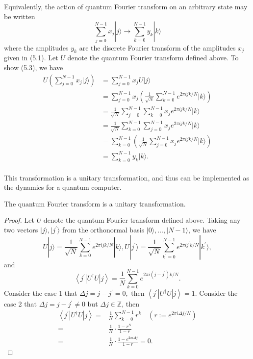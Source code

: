 Equivalently, the action of quantum Fourier transform on an arbitrary state may be written
\begin{equation}
    \sum_{j=0}^{N-1} x_{j}|j\rangle \longrightarrow \sum_{k=0}^{N-1} y_{k}|k\rangle \tag{5.3}
\end{equation}
where the amplitudes $y_{k}$ are the discrete Fourier transform of the amplitudes $x_{j}$ given in (5.1).  Let $U$ denote the quantum Fourier transform defined above. To show (5.3), we have
\begin{align}
    U(\sum_{j=0}^{N-1} x_{j}|j\rangle) &= \sum_{j=0}^{N-1} x_{j} U|j\rangle \\
    &= \sum_{j=0}^{N-1} x_{j} \left(\frac{1}{\sqrt{N}} \sum_{k=0}^{N-1} e^{2 \pi i j k / N}|k\rangle \right) \\
    &= \frac{1}{\sqrt{N}} \sum_{j=0}^{N-1}  \sum_{k=0}^{N-1} x_{j} e^{2 \pi i j k / N}|k\rangle \\
    &= \frac{1}{\sqrt{N}} \sum_{k=0}^{N-1} \sum_{j=0}^{N-1}   x_{j} e^{2 \pi i j k / N}|k\rangle \\
    &= \sum_{k=0}^{N-1} \left(\frac{1}{\sqrt{N}}  \sum_{j=0}^{N-1}   x_{j} e^{2 \pi i j k / N}|k\rangle \right)\\
    &= \sum_{k=0}^{N-1} y_{k}|k\rangle. \\
\end{align}

This transformation is a unitary transformation, and thus can be implemented as the dynamics for a quantum computer. 

\begin{theorem}
    The quantum Fourier transform is a unitary transformation.
\end{theorem}

\begin{proof}
Let $U$ denote the quantum Fourier transform defined above. Taking any two vectors $|j\rangle, |j^{\prime}\rangle$ from the orthonormal basis $|0\rangle, \ldots,|N-1\rangle$, we have 
\begin{equation}
    U|j\rangle=\frac{1}{\sqrt{N}} \sum_{k=0}^{N-1} e^{2 \pi i j k / N}|k\rangle,
U|j^{\prime}\rangle=\frac{1}{\sqrt{N}} \sum_{k^{\prime}=0}^{N-1} e^{2 \pi i j^{\prime} k / N}|k^{\prime}\rangle,
\end{equation}
and
\begin{equation}
    \left\langle j^{\prime}\left|U^{\dagger} U\right| j\right\rangle=\frac{1}{N} \sum_{k=0}^{N-1} e^{2 \pi i\left(j-j^{\prime}\right) k / N}.
\end{equation}
Consider the case 1 that $\Delta j=j-j^{\prime}=0,$ then $\left\langle j^{\prime}\left|U^{\dagger} U\right| j\right\rangle=1.$
Consider the case 2 that $\Delta j=j-j^{\prime} \neq 0$ but $\Delta j  \in \mathbb{Z}$, then
\begin{align}
\left\langle j^{\prime}\left|U^{\dagger} U\right| j\right\rangle = & \frac{1}{N} \sum_{k=0}^{N-1} r^k \quad \left(r:=e^{2 \pi i \Delta j / N}\right) \\
= & \frac{1}{N} \cdot \frac{1-r^N}{1-r} \\ 
= & \frac{1}{N} \cdot  \frac{1-e^{2 \pi i \Delta j}}{1-r}=0.
\end{align}
\end{proof}

